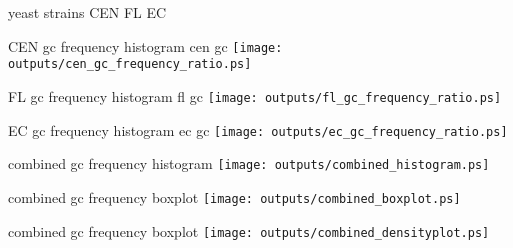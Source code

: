 \documentclass{beamer}
\begin{document}
\begin{frame} {yeast strains}
    CEN
    FL
    EC
\end{frame}

\begin{frame} {CEN gc frequency histogram}
    cen gc
    \texttt{[image: outputs/cen\_gc\_frequency\_ratio.ps]}
\end{frame}

\begin{frame} {FL gc frequency histogram}
    fl gc
    \texttt{[image: outputs/fl\_gc\_frequency\_ratio.ps]}
\end{frame}

\begin{frame} {EC gc frequency histogram}
    ec gc
    \texttt{[image: outputs/ec\_gc\_frequency\_ratio.ps]}
\end{frame}

\begin{frame} {combined gc frequency histogram}
    \texttt{[image: outputs/combined\_histogram.ps]}
\end{frame}

\begin{frame} {combined gc frequency boxplot}
    \texttt{[image: outputs/combined\_boxplot.ps]}
\end{frame}

\begin{frame} {combined gc frequency boxplot}
    \texttt{[image: outputs/combined\_densityplot.ps]}
\end{frame}
\end{document}
